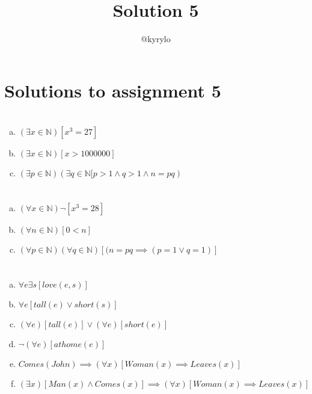 \documentclass{article}
\title{Solution 5}
\author{@kyrylo}
\begin{document}
\section*{Solutions to assignment 5}

\section{}

\begin{enumerate}[(a)]
\item $(\exists x \in \mathbb{N})[x^3 = 27]$
\item $(\exists x \in \mathbb{N})[x > 1000000]$
\item $(\exists p \in \mathbb{N})(\exists q \in \mathbb{N}[p > 1 \wedge q > 1 \wedge n = pq)$
\end{enumerate}

\section{}

\begin{enumerate}[(a)]
\item $(\forall x \in \mathbb{N})\neg[x^3 = 28]$
\item $(\forall n \in \mathbb{N})[0 < n]$
\item $(\forall p \in \mathbb{N})(\forall q \in \mathbb{N})[(n = pq \implies (p = 1 \vee q = 1)]$
\end{enumerate}

\section{}

\begin{enumerate}[(a)]
\item $\forall e\exists s[love(e, s)]$
\item $\forall e[tall(e) \vee short(s)]$
\item $(\forall e)[tall(e)] \vee (\forall e)[short(e)]$
\item $\neg(\forall e)[athome(e)]$
\item $Comes(John) \implies (\forall x)[Woman(x) \implies Leaves(x)]$
\item $(\exists x)[Man(x) \wedge Comes(x)] \implies (\forall x)[Woman(x) \implies Leaves(x)]$
\end{enumerate}

\section{}
\end{document}

